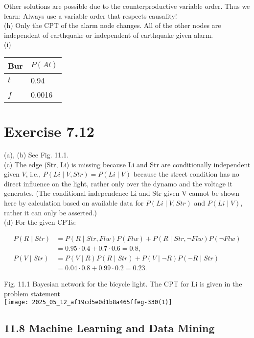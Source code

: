 \documentclass[10pt]{article}
\begin{document}
Other solutions are possible due to the counterproductive variable order. Thus we learn: Always use a variable order that respects causality!\\
(h) Only the CPT of the alarm node changes. All of the other nodes are independent of earthquake or independent of earthquake given alarm.\\
(i)

\begin{center}
\begin{tabular}{ll}
\hline
Bur & $P(A l)$ \\
\hline
$t$ & 0.94 \\
\hline
$f$ & 0.0016 \\
\hline
\end{tabular}
\end{center}

\section*{Exercise 7.12}
(a), (b) See Fig. 11.1.\\
(c) The edge (Str, Li) is missing because Li and Str are conditionally independent given $V$, i.e., $P(L i \mid V, S t r)=P(L i \mid V)$ because the street condition has no direct influence on the light, rather only over the dynamo and the voltage it generates. (The conditional independence Li and Str given V cannot be shown here by calculation based on available data for $P(L i \mid V, S t r)$ and $P(L i \mid V)$, rather it can only be asserted.)\\
(d) For the given CPTs:

$$
\begin{aligned}
P(R \mid S t r) & =P(R \mid S t r, F l w) P(F l w)+P(R \mid S t r, \neg F l w) P(\neg F l w) \\
& =0.95 \cdot 0.4+0.7 \cdot 0.6=0.8, \\
P(V \mid S t r) & =P(V \mid R) P(R \mid S t r)+P(V \mid \neg R) P(\neg R \mid S t r) \\
& =0.04 \cdot 0.8+0.99 \cdot 0.2=0.23 .
\end{aligned}
$$

Fig. 11.1 Bayesian network for the bicycle light. The CPT for Li is given in the problem statement\\
\texttt{[image: 2025\_05\_12\_af19cd5e0d1b8a465ffeg-330(1)]}

\subsection*{11.8 Machine Learning and Data Mining}
\end{document}
